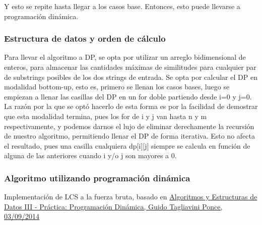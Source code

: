 Y esto se repite hasta llegar a los casos base. Entonces, esto puede llevarse a programación dinámica.

\subsubsection{Estructura de datos y orden de cálculo}

Para llevar el algoritmo a DP, se opta por utilizar un arreglo bidimensional de enteros, para almacenar las cantidades máximas de similitudes para cualquier par de substrings posibles de los dos strings de entrada. Se opta por calcular el DP en modalidad bottom-up, esto es, primero se llenan los casos bases, luego se empiezan a llenar las casillas del DP en un for doble partiendo desde i=0 y j=0. La razón por la que se optó hacerlo de esta forma es por la facilidad de demostrar que esta modalidad termina, pues los for de i y j van hasta n y m respectivamente, y podemos darnos el lujo de eliminar derechamente la recursión de nuestro algoritmo, permitiendo llenar el DP de forma iterativa. Esto no afecta el resultado, pues una casilla cualquiera dp[i][j] siempre se calcula en función de alguna de las anteriores cuando i y/o j son mayores a 0.

\subsubsection{Algoritmo utilizando programación dinámica}



\begin{algorithm}[H]

    
    \DontPrintSemicolon
    \footnotesize


    \caption{Implementación de LCS a la fuerza bruta, basado en \href{https://www.cubawiki.com.ar/images/1/1a/Lcs_tagliavini.pdf}{Algoritmos y Estructuras de Datos III - Práctica: Programación Dinámica, Guido Tagliavini Ponce, 03/09/2014}}
\end{algorithm}

